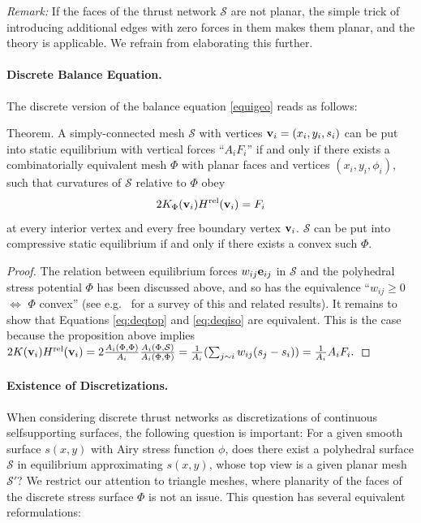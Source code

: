 \documentclass[review]{acmsiggraph}
\def\rel{{\mathord{{\rm rel}}}}
\def\SS{{\mathcal S}}
\begin{document}
{\em Remark:} If the faces of the thrust network $\SS$ are not planar,
the simple trick of introducing additional edges with zero forces in them
makes them planar, and the theory is applicable. We refrain from elaborating
this further.


\paragraph{Discrete Balance Equation.}

The discrete version of the balance equation \eqref{equigeo} reads as 
follows:

\proclaim Theorem.
 A simply-connected mesh $\SS$ with vertices ${\mathbf v}_i=(x_i,y_i,s_i)$
can be put into static equilibrium with vertical forces ``$A_iF_i$'' if
and only if there exists a combinatorially equivalent mesh $\Phi$ with
planar faces and vertices $(x_i,y_i,\phi_i)$, such that curvatures of
$\SS$ relative to $\Phi$ obey
	\begin{equation}
	2 K_\Phi(\vw_i) H^\rel(\vw_i) = F_i
	\label{eq:deqiso}
	\end{equation}
 at every interior vertex and every free boundary vertex ${\mathbf v}_i$. $\SS$
can be put into compressive static equilibrium if and only if there exists
a convex such $\Phi$.

\begin{proof} The relation between equilibrium forces $w_{ij}{\mathbf e}_{ij}$ in 
$\SS$ and the polyhedral stress potential $\Phi$ has been discussed above, 
and so has the equivalence ``$w_{ij}\ge 0$ $\iff$ $\Phi$ convex'' (see 
e.g.\ \cite{Ash1988} for a survey of this and related results). It remains 
to show that Equations \eqref{eq:deqtop} and \eqref{eq:deqiso} are 
equivalent. This is the case because the proposition above implies
	$
	2 K(\vw_i) H^\rel(\vw_i) =
	2 \frac{A_i(\Phi,\Phi)}{A_i}
	\frac{A_i(\Phi,\SS)}{A_i(\Phi,\Phi)} =
	{1\over A_i}
	(\sum_{j\sim i} w_{ij} (s_j-s_i))
	= {1\over A_i} A_i F_i.
	$
	\end{proof}

\paragraph{Existence of Discretizations.}

When considering discrete thrust networks as discretizations of continuous 
self\dash supporting surfaces, the following question is important: For a 
given smooth surface $s(x,y)$ with Airy stress function $\phi$, does there 
exist a polyhedral surface $\SS$ in equilibrium approximating $s(x,y)$, 
whose top view is a given planar mesh $\SS'$? We restrict our attention to 
triangle meshes, where planarity of the faces of the discrete stress 
surface $\Phi$ is not an issue. This question has several equivalent 
reformulations:
\end{document}
